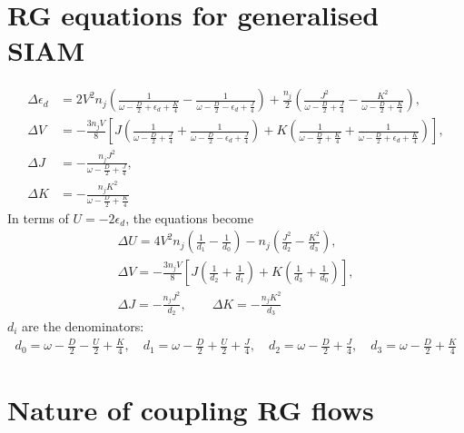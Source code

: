 \documentclass[10pt]{report}
\numberwithin{equation}{section}
\begin{document}
\section{RG equations for generalised SIAM}
\begin{equation}\begin{aligned}
	\Delta \epsilon_d &= 2V^2 n_j\left(\frac{1}{\omega - \frac{D}{2} + \epsilon_d + \frac{K}{4}} - \frac{1}{\omega - \frac{D}{2} - \epsilon_d + \frac{J}{4}}\right) + \frac{n_j}{2}\left(\frac{J^2}{\omega - \frac{D}{2} + \frac{J}{4}} - \frac{K^2}{\omega - \frac{D}{2} + \frac{K}{4}}\right),\\
	\Delta V &= -\frac{3n_j V}{8}\left[J\left(\frac{1}{\omega - \frac{D}{2} + \frac{J}{4}} + \frac{1}{\omega - \frac{D}{2} - \epsilon_d + \frac{J}{4}}\right) + K \left(\frac{1}{\omega - \frac{D}{2} + \frac{K}{4}} + \frac{1}{\omega - \frac{D}{2} + \epsilon_d + \frac{K}{4}}\right)\right],\\
	\Delta J &= -\frac{n_j J^2}{\omega - \frac{D}{2} + \frac{J}{4}},\\ 
	\Delta K &= -\frac{n_j K^2}{\omega - \frac{D}{2} + \frac{K}{4}}
\end{aligned}\end{equation}
In terms of \(U = -2\epsilon_d\), the equations become
\begin{gather}
	\Delta U = 4V^2 n_j\left(\frac{1}{d_1} - \frac{1}{d_0}\right) - n_j\left(\frac{J^2}{d_2} - \frac{K^2}{d_3}\right),\\
	\Delta V = -\frac{3n_j V}{8}\left[J\left(\frac{1}{d_2} + \frac{1}{d_1}\right) + K \left(\frac{1}{d_3} + \frac{1}{d_0}\right)\right],\\
	\Delta J = -\frac{n_j J^2}{d_2}, \quad\quad\Delta K = -\frac{n_j K^2}{d_3}
\end{gather}
\(d_i\) are the denominators:
\begin{equation}\begin{aligned}
	\label{denominators}
	d_0 = \omega - \frac{D}{2} - \frac{U}{2} + \frac{K}{4}, \quad d_1 = \omega - \frac{D}{2} + \frac{U}{2} + \frac{J}{4}, \quad d_2 = \omega - \frac{D}{2} + \frac{J}{4}, \quad d_3 = \omega - \frac{D}{2} + \frac{K}{4}
\end{aligned}\end{equation}

\section{Nature of coupling RG flows}
\end{document}
